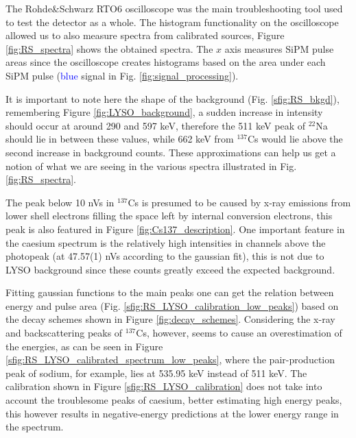 The Rohde\&Schwarz RTO6 oscilloscope was the main troubleshooting tool used to test the detector as a whole. The histogram functionality on the oscilloscope allowed us to also measure spectra from calibrated sources, Figure \ref{fig:RS_spectra} shows the obtained spectra. The $x$ axis measures SiPM pulse areas since the oscilloscope creates histograms based on the area under each SiPM pulse (\textcolor{blue}{blue} signal in Fig. \ref{fig:signal_processing}).

It is important to note here the shape of the background (Fig. \ref{sfig:RS_bkgd}), remembering Figure \ref{fig:LYSO_background}, a sudden increase in intensity should occur at around 290 and 597 \unit{\kilo\eV}, therefore the 511 \unit{\kilo\eV} peak of $^{22}$Na should lie in between these values, while 662 \unit{\kilo\eV} from $^{137}$Cs would lie above the second increase in background counts. These approximations can help us get a notion of what we are seeing in the various spectra illustrated in Fig. \ref{fig:RS_spectra}.

The peak below 10 nVs in $^{137}$Cs is presumed to be caused by x-ray emissions from lower shell electrons filling the space left by internal conversion electrons, this peak is also featured in Figure \ref{fig:Cs137_description}. One important feature in the caesium spectrum is the relatively high intensities in channels above the photopeak (at 47.57(1) nVs according to the gaussian fit), this is not due to LYSO background since these counts greatly exceed the expected background.

Fitting gaussian functions to the main peaks one can get the relation between energy and pulse area (Fig. \ref{sfig:RS_LYSO_calibration_low_peaks}) based on the decay schemes shown in Figure \ref{fig:decay_schemes}. Considering the x-ray and backscattering peaks of $^{137}$Cs, however, seems to cause an overestimation of the energies, as can be seen in Figure \ref{sfig:RS_LYSO_calibrated_spectrum_low_peaks}, where the pair-production peak of sodium, for example, lies at 535.95 keV instead of 511 keV. The calibration shown in Figure \ref{sfig:RS_LYSO_calibration} does not take into account the troublesome peaks of caesium, better estimating high energy peaks, this however results in negative-energy predictions at the lower energy range in the spectrum.

